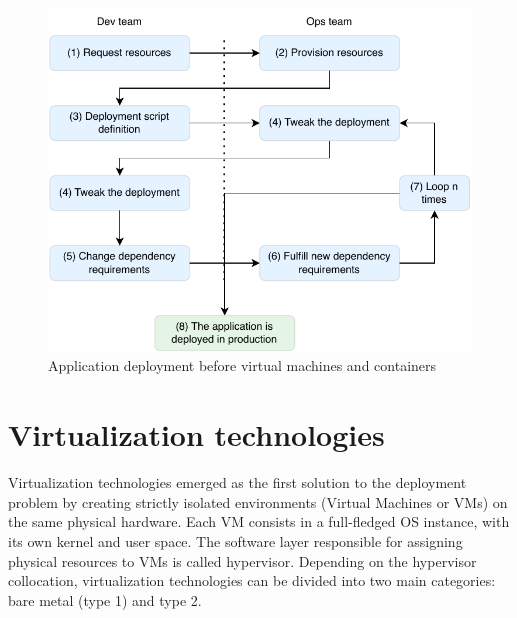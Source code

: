 \begin{figure}[htbp]
    \vspace{10pt}
    \centering
    \includegraphics{assets/deployment_traditional.pdf}
    \caption{Application deployment before virtual machines and containers}
    \label{fig:traditional_deployment}
    \vspace{10pt}
\end{figure}

\section{Virtualization technologies}
Virtualization technologies emerged as the first solution to the deployment problem by creating strictly isolated environments (Virtual Machines or VMs) on the same physical hardware. 
Each VM consists in a full-fledged OS instance, with its own kernel and user space.
The software layer responsible for assigning physical resources to VMs is called hypervisor.
Depending on the hypervisor collocation, virtualization technologies can be divided into two main categories: bare metal (type 1) and type 2. 

